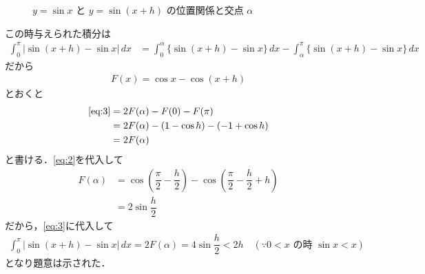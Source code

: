 \documentclass[../../main.tex]{subfiles}
\begin{document}
\begin{figure}[htb]
\begin{center}
    \caption{$y = \sin x$ と $y = \sin(x+h)$ の位置関係と交点 $\alpha$}
  \end{center}
\end{figure}

この時与えられた積分は
\begin{align}
  \int_0^\pi |\sin(x+h) - \sin x| \, dx
  &= \int_0^\alpha \{ \sin(x+h) - \sin x \} \, dx - \int_\alpha^\pi \{ \sin(x+h) - \sin x \} \, dx \label{eq:3}
\end{align}
だから
\begin{align}
  F(x) = \cos x - \cos(x+h)
\end{align}
とおくと
\begin{align}
  \text{\cref{eq:3}}
  &= 2F(\alpha) - F(0) - F(\pi) \\
  &= 2F(\alpha) - (1 - \cos h) - (-1 + \cos h) \\
  &= 2F(\alpha) \label{eq:4}
\end{align}
と書ける．\cref{eq:2}を代入して
\begin{align}
  F(\alpha)
  &= \cos\left(\dfrac{\pi}{2} - \dfrac{h}{2}\right) - \cos\left(\dfrac{\pi}{2} - \dfrac{h}{2} + h\right) \\
  &= 2\sin\dfrac{h}{2}
\end{align}
だから，\cref{eq:3}に代入して
\begin{align}
  \int_0^\pi |\sin(x+h) - \sin x| \, dx = 2F(\alpha) = 4\sin\dfrac{h}{2} < 2h \quad (\because 0 < x \text{ の時 } \sin x < x)
\end{align}
となり題意は示された．
\end{document}
